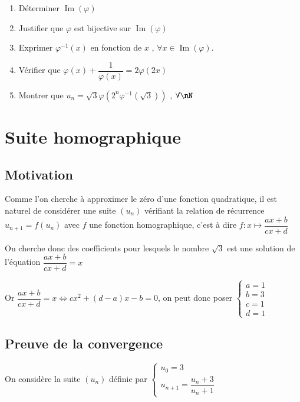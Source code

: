 \documentclass[oneside,12pt]{article}          %
\begin{document}
\begin{enumerate}
    \item Déterminer $\operatorname{Im}(\varphi)$
    
    \item Justifier que $\varphi$ est bijective sur $\operatorname{Im}(\varphi)$

    \item Exprimer $\varphi^{-1}(x)$ en fonction de $x$ , \quad $\forall x\in\operatorname{Im}(\varphi).$

    \item Vérifier que $\varphi(x) + \dfrac{1}{\varphi(x)} = 2\varphi(2x)$

    \item Montrer que $u_n = \sqrt3 \varphi \left(2^n \varphi^{-1}(\sqrt3)\right)$ , \quad $\forall \nN$

\end{enumerate}



\newpage



\section{Suite homographique}

\subsection{Motivation}

Comme l'on cherche à approximer le zéro d'une fonction quadratique, il est naturel de considérer une suite $(u_n)$ vérifiant la relation de récurrence $u_{n+1} = f(u_n)$ avec $f$ une fonction homographique, c'est à dire $f:x\mapsto\dfrac{ax+b}{cx+d}$

On cherche donc des coefficients pour lesquels le nombre $\sqrt{3}$ est une solution de l'équation $\dfrac{ax+b}{cx+d} = x$

Or $\dfrac{ax+b}{cx+d} = x \iff cx^2 + (d-a)x -b = 0$, \quad on peut donc poser $\begin{cases}a=1\\b=3\\c=1\\d=1\end{cases}$



\subsection{Preuve de la convergence}
On considère la suite $(u_n)$ définie par $\begin{cases}u_0 = 3 \\ u_{n+1} = \dfrac{u_n + 3}{u_n + 1}\end{cases}$
\end{document}
